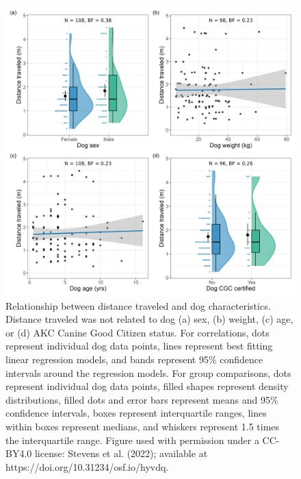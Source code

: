 \documentclass[
  doc]{apa6}
\begin{document}
\begin{figure}

{\centering \includegraphics[width=0.95\linewidth]{figures/dog_characteristics} 

}

\caption{Relationship between distance traveled and dog characteristics. Distance traveled was not related to dog (a) sex, (b) weight, (c) age, or (d) AKC Canine Good Citizen status. For correlations, dots represent individual dog data points, lines represent best fitting linear regression models, and bands represent 95\% confidence intervals around the regression models. For group comparisons, dots represent individual dog data points, filled shapes represent density distributions, filled dots and error bars represent means and 95\% confidence intervals, boxes represent interquartile ranges, lines within boxes represent medians, and whiskers represent 1.5 times the interquartile range.  Figure used with permission under a CC-BY4.0 license: Stevens et al. (2022); available at https://doi.org/10.31234/osf.io/hyvdq.}\label{fig:dog-char}
\end{figure}
\end{document}
